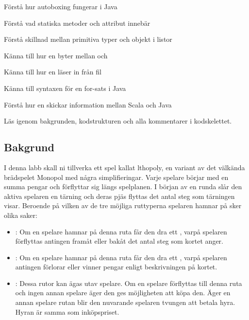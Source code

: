 

\Teamlab{\LabWeekELEVEN}

\begin{Goals}
\item Förstå hur autoboxing fungerar i Java
\item Förstå vad statiska metoder och attribut innebär
\item Förstå skillnad mellan primitiva typer och objekt i listor
\item Känna till hur en byter mellan  och 
\item Känna till hur en läser in från fil
\item Känna till syntaxen för en for-sats i Java
\item Förstå hur en skickar information mellan Scala och Java
\end{Goals}

\begin{Preparations}
\item {}
\item Läs igenom bakgrunden, kodstrukturen och alla kommentarer i kodskelettet.

\end{Preparations}

\subsection{Bakgrund}
I denna labb skall ni tillverka ett spel kallat lthopoly, en variant av det välkända brädspelet Monopol med några simplifieringar. Varje spelare börjar med en summa pengar och förflyttar sig längs spelplanen.
I början av en runda slår den aktiva spelaren en tärning och deras pjäs flyttas det antal steg som tärningen visar.
Beroende på vilken av de tre möjliga ruttyperna spelaren hamnar på sker olika saker:

\begin{itemize}
\item {}: Om en spelare hamnar på denna ruta får den dra ett , varpå spelaren förflyttas antingen framåt eller bakåt det antal steg som kortet anger.
\item {}: Om en spelare hamnar på denna ruta får den dra ett , varpå spelaren antingen förlorar eller vinner pengar enligt beskrivningen på kortet.
\item {}: Dessa rutor kan ägas utav spelare. Om en spelare förflyttas till denna ruta och ingen annan spelare äger den ges möjligheten att köpa den. Äger en annan spelare rutan blir den nuvarande spelaren tvungen att betala hyra. Hyran är samma som inköpspriset.
\end{itemize}

